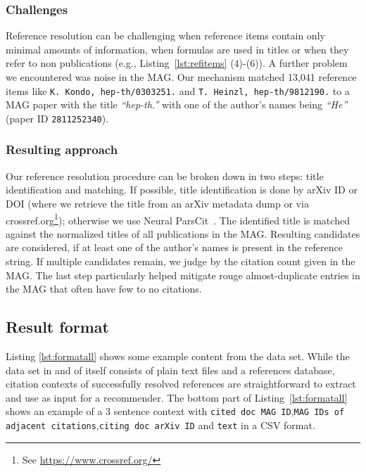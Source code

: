 \subsubsection{Challenges}
Reference resolution can be challenging when reference items contain only minimal amounts of information, when formulas are used in titles or when they refer to non publications (e.g., Listing~\ref{lst:refitems} (4)-(6)). A further problem we encountered was noise in the MAG. Our mechanism matched 13,041 reference items like \texttt{K. Kondo, hep-th/0303251.} and \texttt{T. Heinzl, hep-th/9812190.} to a MAG paper with the title \textit{``hep-th.''} with one of the author's names being \textit{``He''} (paper ID \texttt{2811252340}).

\subsubsection{Resulting approach}
Our reference resolution procedure can be broken down in two steps: title identification and matching. If possible, title identification is done by arXiv ID or DOI (where we retrieve the title from an arXiv metadata dump or via crossref.org\footnote{See \url{https://www.crossref.org/}}); otherwise we use Neural ParsCit~\cite{Animesh2018}. The identified title is matched against the normalized titles of all publications in the MAG. Resulting candidates are considered, if at least one of the author's names is present in the reference string. If multiple candidates remain, we judge by the citation count given in the MAG. The last step particularly helped mitigate rouge almost-duplicate entries in the MAG that often have few to no citations.

\subsection{Result format}
Listing \ref{lst:formatall} shows some example content from the data set. While the data set in and of itself consists of plain text files and a references database, citation contexts of successfully resolved references are straightforward to extract and use as input for a recommender. The bottom part of Listing~\ref{lst:formatall} shows an example of a 3 sentence context with \texttt{cited doc MAG ID},\hphantom{n}\texttt{MAG IDs of adjacent citations},\hphantom{n}\texttt{citing doc arXiv ID} and \texttt{text} in a CSV format.

